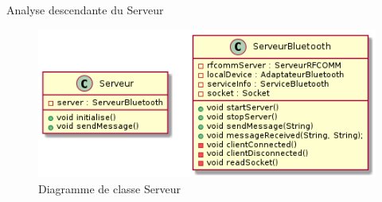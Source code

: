 Analyse descendante du Serveur
	\begin{figure}[H]
		\centering
		\includegraphics[scale=1]{./images/diagrammeClasseServeur.png}
		\caption{Diagramme de classe Serveur}
	\end{figure}